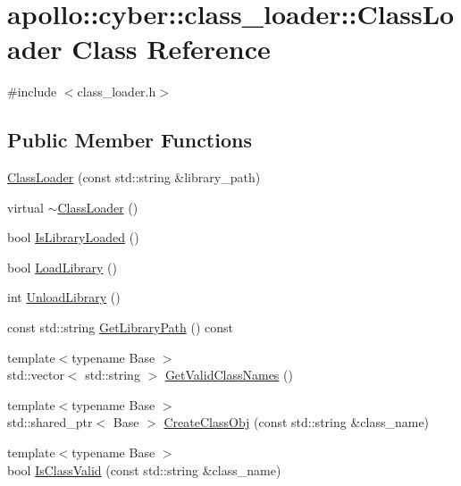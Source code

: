 \hypertarget{classapollo_1_1cyber_1_1class__loader_1_1ClassLoader}{\section{apollo\-:\-:cyber\-:\-:class\-\_\-loader\-:\-:Class\-Loader Class Reference}
\label{classapollo_1_1cyber_1_1class__loader_1_1ClassLoader}
}


{\ttfamily \#include $<$class\-\_\-loader.\-h$>$}

\subsection*{Public Member Functions}
\begin{DoxyCompactItemize}
\item 
\hyperlink{classapollo_1_1cyber_1_1class__loader_1_1ClassLoader_ae563608511e63fade96914581cf30f26}{Class\-Loader} (const std\-::string \&library\-\_\-path)
\item 
virtual \hyperlink{classapollo_1_1cyber_1_1class__loader_1_1ClassLoader_a55141d6d041e0f3ac3b304a75c5e3e8f}{$\sim$\-Class\-Loader} ()
\item 
bool \hyperlink{classapollo_1_1cyber_1_1class__loader_1_1ClassLoader_a68a84173ef3e6be8efc2608fe9904bb4}{Is\-Library\-Loaded} ()
\item 
bool \hyperlink{classapollo_1_1cyber_1_1class__loader_1_1ClassLoader_a1a3b7f75f4f52cc1e187404bac779283}{Load\-Library} ()
\item 
int \hyperlink{classapollo_1_1cyber_1_1class__loader_1_1ClassLoader_ad255edf388b7bbb53701e68807ab4295}{Unload\-Library} ()
\item 
const std\-::string \hyperlink{classapollo_1_1cyber_1_1class__loader_1_1ClassLoader_a1600e6d8a1841af3214505fc953f07e8}{Get\-Library\-Path} () const 
\item 
{\footnotesize template$<$typename Base $>$ }\\std\-::vector$<$ std\-::string $>$ \hyperlink{classapollo_1_1cyber_1_1class__loader_1_1ClassLoader_a43103c22c08798fce3eaa7263e608e9d}{Get\-Valid\-Class\-Names} ()
\item 
{\footnotesize template$<$typename Base $>$ }\\std\-::shared\-\_\-ptr$<$ Base $>$ \hyperlink{classapollo_1_1cyber_1_1class__loader_1_1ClassLoader_ad869f2d0f2933e13b2e7765785287e41}{Create\-Class\-Obj} (const std\-::string \&class\-\_\-name)
\item 
{\footnotesize template$<$typename Base $>$ }\\bool \hyperlink{classapollo_1_1cyber_1_1class__loader_1_1ClassLoader_a9717e7566534e5395b3d3b8d4229f473}{Is\-Class\-Valid} (const std\-::string \&class\-\_\-name)
\end{DoxyCompactItemize}
